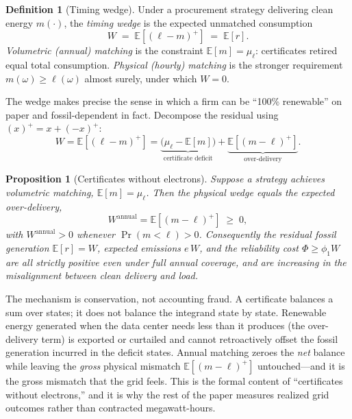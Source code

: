 \documentclass[a4paper,fleqn,longmktitle]{cas-sc}
\theoremstyle{plain}
\newtheorem{proposition}{Proposition}
\theoremstyle{definition}
\newtheorem{definition}{Definition}
\newcommand{\E}{\mathbb{E}}
\newcommand{\pos}[1]{\left(#1\right)^{+}}
\begin{document}
\begin{definition}[Timing wedge]\label{def:wedge}
Under a procurement strategy delivering clean energy $m(\cdot)$, the \emph{timing wedge} is the expected unmatched consumption
\begin{equation}
    W \;=\; \E\!\left[\pos{\ell-m}\right]\;=\;\E[r].
\end{equation}
\emph{Volumetric (annual) matching} is the constraint $\E[m]=\mu_\ell$: certificates retired equal total consumption. \emph{Physical (hourly) matching} is the stronger requirement $m(\omega)\ge\ell(\omega)$ almost surely, under which $W=0$.
\end{definition}

The wedge makes precise the sense in which a firm can be ``100\% renewable'' on paper and fossil-dependent in fact. Decompose the residual using $\pos{x}=x+\pos{-x}$:
\begin{equation}
    W=\E\!\left[\pos{\ell-m}\right]=\underbrace{\big(\mu_\ell-\E[m]\big)}_{\text{certificate deficit}}+\underbrace{\E\!\left[\pos{m-\ell}\right]}_{\text{over-delivery}}.
    \label{eq:wedge-identity}
\end{equation}

\begin{proposition}[Certificates without electrons]\label{prop:wedge}
Suppose a strategy achieves volumetric matching, $\E[m]=\mu_\ell$. Then the physical wedge equals the expected over-delivery,
\begin{equation}
    W^{\mathrm{annual}}=\E\!\left[\pos{m-\ell}\right]\;\ge\;0,
\end{equation}
with $W^{\mathrm{annual}}>0$ whenever $\Pr(m<\ell)>0$. Consequently the residual fossil generation $\E[r]=W$, expected emissions $e\,W$, and the reliability cost $\Phi\ge\phi_1 W$ are all strictly positive even under full annual coverage, and are increasing in the misalignment between clean delivery and load.
\end{proposition}

The mechanism is conservation, not accounting fraud. A certificate balances a sum over states; it does not balance the integrand state by state. Renewable energy generated when the data center needs less than it produces (the over-delivery term) is exported or curtailed and cannot retroactively offset the fossil generation incurred in the deficit states. Annual matching zeroes the \emph{net} balance while leaving the \emph{gross} physical mismatch $\E[\pos{m-\ell}]$ untouched---and it is the gross mismatch that the grid feels. This is the formal content of ``certificates without electrons,'' and it is why the rest of the paper measures realized grid outcomes rather than contracted megawatt-hours.
\end{document}
